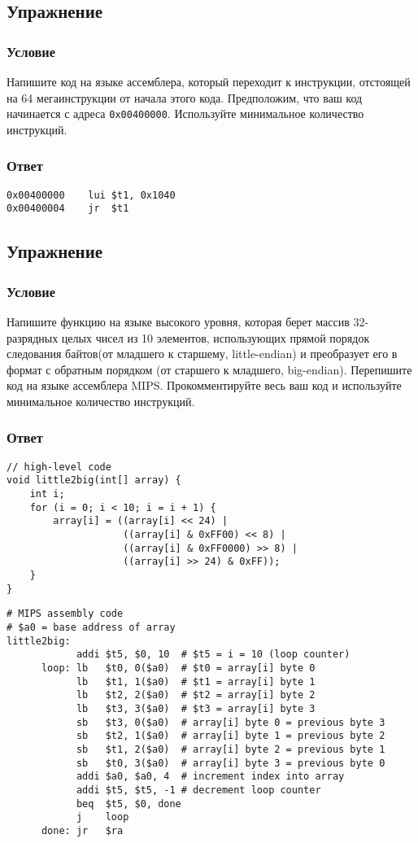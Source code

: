 \documentclass[12pt]{article}
\newenvironment{e}[1][dummy label]{
    \subsection{Упражнение}\label{#1}
    \subsubsection*{Условие}
    }{
    \subsubsection*{Ответ}
}
\begin{document}
    \begin{e}
        Напишите код на языке ассемблера, который переходит к инструкции, отстоящей на 64 мегаинструкции от начала этого кода. Предположим, что ваш код начинается с адреса \texttt{0x00400000}. Используйте минимальное количество инструкций.
    \end{e}

    \begin{verbatim}
0x00400000    lui $t1, 0x1040
0x00400004    jr  $t1
    \end{verbatim}

    \newpage

    \begin{e}
        Напишите функцию на языке высокого уровня, которая берет массив 32-разрядных целых чисел из 10 элементов, использующих прямой порядок следования байтов(от младшего к старшему, little-endian) и преобразует его в формат с обратным порядком (от старшего к младшего, big-endian). Перепишите код на языке ассемблера MIPS. Прокомментируйте весь ваш код и используйте минимальное количество инструкций.
    \end{e}

    \begin{verbatim}
// high-level code
void little2big(int[] array) {
    int i;
    for (i = 0; i < 10; i = i + 1) {
        array[i] = ((array[i] << 24) |
                    ((array[i] & 0xFF00) << 8) |
                    ((array[i] & 0xFF0000) >> 8) |
                    ((array[i] >> 24) & 0xFF));
    }
}
    \end{verbatim}
    \begin{verbatim}
# MIPS assembly code
# $a0 = base address of array
little2big:
            addi $t5, $0, 10  # $t5 = i = 10 (loop counter)
      loop: lb   $t0, 0($a0)  # $t0 = array[i] byte 0
            lb   $t1, 1($a0)  # $t1 = array[i] byte 1
            lb   $t2, 2($a0)  # $t2 = array[i] byte 2
            lb   $t3, 3($a0)  # $t3 = array[i] byte 3
            sb   $t3, 0($a0)  # array[i] byte 0 = previous byte 3
            sb   $t2, 1($a0)  # array[i] byte 1 = previous byte 2
            sb   $t1, 2($a0)  # array[i] byte 2 = previous byte 1
            sb   $t0, 3($a0)  # array[i] byte 3 = previous byte 0
            addi $a0, $a0, 4  # increment index into array
            addi $t5, $t5, -1 # decrement loop counter
            beq  $t5, $0, done
            j    loop
      done: jr   $ra
    \end{verbatim}

    \newpage
\end{document}
